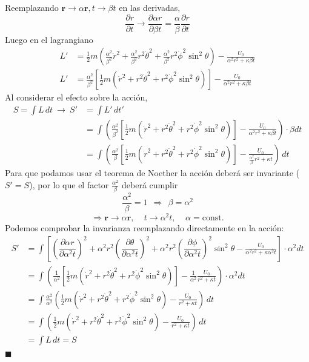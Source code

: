 \documentclass[]{article}
\numberwithin{equation}{section}
\newcommand{\0}{\textcolor{gray}{0}}
\newcommand{\rv}{\mathbf{r}}
\newcommand{\pd}[2]{\dfrac{\partial #1}{\partial #2}}
\newcommand{\qed}{\hfill\(\blacksquare\)}
\begin{document}
\begin{enumerate}
	Reemplazando $\rv \rightarrow \alpha \rv, t\rightarrow \beta t$ en las derivadas,
	\begin{equation}
		\pd{r}{t} \rightarrow \pd{\alpha r}{\beta t} = \frac{\alpha}{\beta} \pd{r}{t}
	\end{equation}
	Luego en el lagrangiano
	\begin{align*}
		L' &= \frac{1}{2}m \left(\frac{\alpha^2}{\beta^2} \dot{r}^2 + \frac{\alpha^2}{\beta^2} r^2 \dot{\theta}^2 + \frac{\alpha^2}{\beta^2} r^2\dot{\phi}^2 \sin^2 \theta \right) - \frac{U_0}{\alpha^2 r^2 + \kappa \beta t}\\
		L' &= \frac{\alpha^2}{\beta^2} \left[\frac{1}{2}m \left(\dot{r}^2 + r^2 \dot{\theta}^2 + r^2\dot{\phi}^2 \sin^2 \theta \right) \right] - \frac{U_0}{\alpha^2 r^2 + \kappa \beta t}
	\end{align*}
	Al considerar el efecto sobre la acción,
	\begin{align*}
		S = \int L \, dt ~\rightarrow~ S' &= \int L' \, dt' \\
		&= \int \left(\frac{\alpha^2}{\beta^2} \left[\frac{1}{2}m \left(\dot{r}^2 + r^2 \dot{\theta}^2 + r^2\dot{\phi}^2 \sin^2 \theta \right)\right] - \frac{U_0}{\alpha^2 r^2 + \kappa \beta t} \right) \cdot \beta dt\\
		&= \int \left(\frac{\alpha^2}{\beta} \left[\frac{1}{2}m \left(\dot{r}^2 + r^2 \dot{\theta}^2 + r^2\dot{\phi}^2 \sin^2 \theta \right)\right] - \frac{U_0}{\frac{\alpha^2}{\beta} r^2 + \kappa t} \right)  \, dt
	\end{align*}
	Para que podamos usar el teorema de Noether la acción deberá ser invariante ($S' = S$), por lo que el factor $\frac{\alpha^2}{\beta}$ deberá cumplir
	\begin{equation*}
		\frac{\alpha^2}{\beta} = 1 ~~ \Rightarrow ~~ \beta = \alpha^2
	\end{equation*}
	\begin{equation*}
		\Rightarrow \rv \rightarrow \alpha \rv, ~~~~~ t\rightarrow \alpha^2 t, ~~~~~ \alpha = \mathrm{const.}
	\end{equation*}
	Podemos comprobar la invarianza reemplazando directamente en la acción:
	\begin{align*}
		S' &= \int \left[\left(\pd{\alpha r}{\alpha^2 t}\right)^2 + \alpha^2 r^2 \left(\pd{\theta}{\alpha^2 t}\right)^2 + \alpha^2 r^2 \left(\pd{\phi}{\alpha^2 t}\right)^2 \sin^2 \theta - \frac{U_0}{\alpha^2 r^2 + \kappa \alpha^2 t} \right] \cdot \alpha^2 dt\\
		&= \int \left(\frac{1}{\alpha^2} \left[\frac{1}{2}m \left(\dot{r}^2 + r^2 \dot{\theta}^2 + r^2\dot{\phi}^2 \sin^2 \theta \right)\right] - \frac{1}{\alpha^2} \frac{U_0}{ r^2 + \kappa t} \right) \cdot \alpha^2 dt\\
		&= \int \frac{\alpha^2}{\alpha^2} \left(\frac{1}{2}m \left(\dot{r}^2 + r^2 \dot{\theta}^2 + r^2\dot{\phi}^2 \sin^2 \theta \right) - \frac{U_0}{ r^2 + \kappa t} \right) \, dt\\
		&= \int \left(\frac{1}{2}m \left(\dot{r}^2 + r^2 \dot{\theta}^2 + r^2\dot{\phi}^2 \sin^2 \theta \right) - \frac{U_0}{ r^2 + \kappa t} \right) \, dt\\
		&= \int L \, dt = S
	\end{align*} 
	\qed
	

\end{enumerate}
\end{document}
